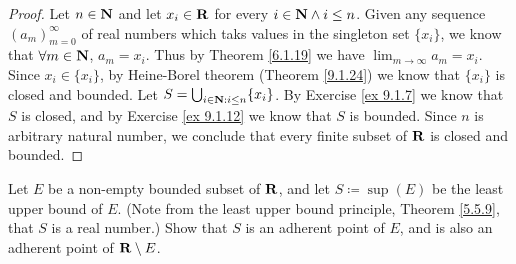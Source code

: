 \begin{proof}
    Let \(n \in \mathbf{N}\) and let \(x_i \in \mathbf{R}\) for every \(i \in \mathbf{N} \land i \leq n\).
    Given any sequence \((a_m)_{m = 0}^\infty\) of real numbers which taks values in the singleton set \(\{x_i\}\), we know that \(\forall m \in \mathbf{N}\), \(a_m = x_i\).
    Thus by Theorem \ref{6.1.19} we have \(\lim_{m \to \infty} a_m = x_i\).
    Since \(x_i \in \{x_i\}\), by Heine-Borel theorem (Theorem \ref{9.1.24}) we know that \(\{x_i\}\) is closed and bounded.
    Let \(S = \bigcup_{i \in \mathbf{N} : i \leq n} \{x_i\}\).
    By Exercise \ref{ex 9.1.7} we know that \(S\) is closed, and by Exercise \ref{ex 9.1.12} we know that \(S\) is bounded.
    Since \(n\) is arbitrary natural number, we conclude that every finite subset of \(\mathbf{R}\) is closed and bounded.
\end{proof}

\begin{exercise}\label{ex 9.1.15}
    Let \(E\) be a non-empty bounded subset of \(\mathbf{R}\), and let \(S \coloneqq \sup(E)\) be the least upper bound of \(E\).
    (Note from the least upper bound principle, Theorem \ref{5.5.9}, that \(S\) is a real number.)
    Show that \(S\) is an adherent point of \(E\), and is also an adherent point of \(\mathbf{R} \setminus E\).
\end{exercise}

